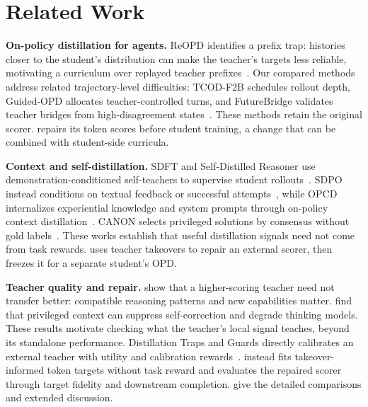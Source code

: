 \section{Related Work}
\label{sec:related}

\textbf{On-policy distillation for agents.}
ReOPD identifies a prefix trap: histories closer to the student's distribution can make the teacher's targets less reliable, motivating a curriculum over replayed teacher prefixes~\citep{reopd2026}.
Our compared methods address related trajectory-level difficulties: TCOD-F2B schedules rollout depth, Guided-OPD allocates teacher-controlled turns, and FutureBridge validates teacher bridges from high-disagreement states~\citep{tcod2026,guidedopd2026,futurebridge2026}.
These methods retain the original scorer.
\method{} repairs its token scores before student training, a change that can be combined with student-side curricula.

\textbf{Context and self-distillation.}
SDFT and Self-Distilled Reasoner use demonstration-conditioned self-teachers to supervise student rollouts~\citep{sdft2026,opsd2026}.
SDPO instead conditions on textual feedback or successful attempts~\citep{sdpo2026}, while OPCD internalizes experiential knowledge and system prompts through on-policy context distillation~\citep{opcd2026}.
CANON selects privileged solutions by consensus without gold labels~\citep{canon2026}.
These works establish that useful distillation signals need not come from task rewards.
\method{} uses teacher takeovers to repair an external scorer, then freezes it for a separate student's OPD.

\textbf{Teacher quality and repair.}
\citet{li2026bestval} show that a higher-scoring teacher need not transfer better: compatible reasoning patterns and new capabilities matter.
\citet{rethinkingopsd2026} find that privileged context can suppress self-correction and degrade thinking models.
These results motivate checking what the teacher's local signal teaches, beyond its standalone performance.
Distillation Traps and Guards directly calibrates an external teacher with utility and calibration rewards~\citep{trapsguards2026}.
\method{} instead fits takeover-informed token targets without task reward and evaluates the repaired scorer through target fidelity and downstream completion.
 give the detailed comparisons and extended discussion.
